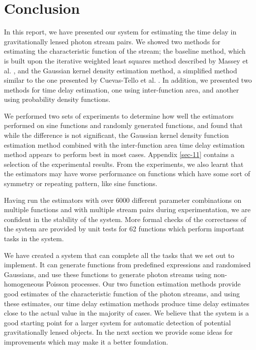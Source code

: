 \documentclass[a4paper,11pt,twoside]{article}
\begin{document}
\section{Conclusion}
\label{sec-9}

  In this report, we have presented our system for estimating the time delay in
  gravitationally lensed photon stream pairs. We showed two methods for
  estimating the characteristic function of the stream; the baseline method,
  which is built upon the iterative weighted least squares method described by
  Massey et al. \cite{massey1996estimating}, and the Gaussian kernel density
  estimation method, a simplified method similar to the one presented by
  Cuevas-Tello et al. \cite{cuevas2006accurate}. In addition, we presented two
  methods for time delay estimation, one using inter-function area, and another
  using probability density functions.

  We performed two sets of experiments to determine how well the estimators
  performed on sine functions and randomly generated functions, and found that
  while the difference is not significant, the Gaussian kernel density function
  estimation method combined with the inter-function area time delay estimation
  method appears to perform best in most cases. Appendix \ref{sec-11}
  contains a selection of the experimental results. From the experiments, we
  also learnt that the estimators may have worse performance on functions which
  have some sort of symmetry or repeating pattern, like sine functions.
  
  Having run the estimators with over 6000 different parameter combinations on
  multiple functions and with multiple stream pairs during experimentation, we
  are confident in the stability of the system. More formal checks of the
  correctness of the system are provided by unit tests for 62 functions which
  perform important tasks in the system.

  We have created a system that can complete all the tasks that we set out to
  implement. It can generate functions from predefined expressions and
  randomised Gaussians, and use these functions to generate photon streams using
  non-homogeneous Poisson processes. Our two function estimation methods provide
  good estimates of the characteristic function of the photon streams, and using
  these estimates, our time delay estimation methods produce time delay
  estimates close to the actual value in the majority of cases. We believe that
  the system is a good starting point for a larger system for automatic
  detection of potential gravitationally lensed objects. In the next section we
  provide some ideas for improvements which may make it a better foundation.
\end{document}
